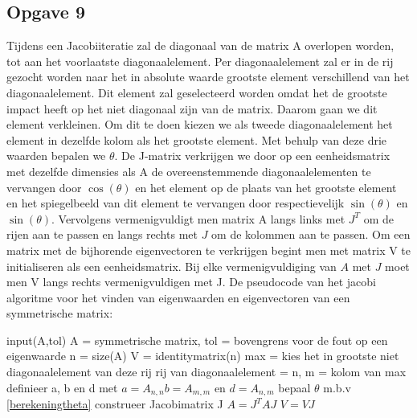 \documentclass[a4paper, 12pt, titlepage]{report}
\begin{document}
\subsection{Opgave 9}
Tijdens een Jacobiiteratie zal de diagonaal van de matrix A overlopen worden, tot aan het voorlaatste diagonaalelement. Per diagonaalelement zal er in de rij gezocht worden naar het in absolute waarde grootste element verschillend van het diagonaalelement. Dit element zal geselecteerd worden omdat het de grootste impact heeft op het niet diagonaal zijn van de matrix. Daarom gaan we dit element verkleinen. Om dit te doen kiezen we als tweede diagonaalelement het element in dezelfde kolom als het grootste element. Met behulp van deze drie waarden bepalen we $\theta$. De J-matrix verkrijgen we door op een eenheidsmatrix met dezelfde dimensies als A  de overeenstemmende diagonaalelementen te vervangen door $\cos(\theta)$ en het element op de plaats van het grootste element en het spiegelbeeld van dit element te vervangen door respectievelijk $\sin(\theta)$ en $\sin(\theta)$. Vervolgens vermenigvuldigt men matrix A langs links met $J^T$ om de rijen aan te passen en langs rechts met $J$ om de kolommen aan te passen.
Om een matrix met de bijhorende eigenvectoren te verkrijgen begint men met matrix V te initialiseren als een eenheidsmatrix. Bij elke vermenigvuldiging van $A$ met $J$ moet men V langs rechts vermenigvuldigen met J.
De pseudocode van het jacobi algoritme voor het vinden van eigenwaarden en eigenvectoren van een symmetrische matrix:
\begin{algorithmic}
 \STATE input(A,tol)  A = symmetrische matrix, tol = bovengrens voor de fout op een eigenwaarde 
 \STATE n = size(A)
 \STATE V = identitymatrix(n)
 \STATE 		max = kies het in grootste niet diagonaalelement van deze rij
 \STATE rij van diagonaalelement = n, m = kolom van max
 \STATE definieer a, b en d met $a=A_{n,n} b = A_{m,m}$ en $d = A_{n,m}$
 \STATE bepaal $\theta$ m.b.v \eqref{berekeningtheta}
 \STATE construeer Jacobimatrix J 
 \STATE $A = J^TAJ$
 \STATE $V = VJ $
	\ENDFOR
\ENDWHILE
\end{algorithmic}
\end{document}
